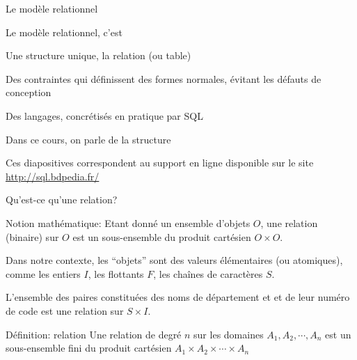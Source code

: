 
\begin{frame}[fragile]{Le modèle relationnel}

Le modèle relationnel, c'est

\begin{redbullet}
  \item Une structure unique, la relation (ou table)
  \item Des contraintes qui définissent des \alert{formes normales}, évitant les défauts de conception
  \item Des langages, concrétisés en pratique par SQL
\end{redbullet}

\vfill

Dans ce cours, on parle de la structure

\vfill
\begin{blocgauche}
\alert{Ces diapositives correspondent au support en ligne disponible sur
le site \url{http://sql.bdpedia.fr/}}
\end{blocgauche}

\end{frame}


\begin{frame}{Qu'est-ce qu'une relation?}

\alert{Notion mathématique}: 
Etant donné un ensemble d'objets $O$, une \alert{relation} (binaire)
sur $O$  est un sous-ensemble du produit cartésien $O \times O$.

\vfill
 Dans notre contexte, les ``objets''  sont des \alert{valeurs élémentaires} 
 (ou \alert{atomiques}), comme 
 les entiers $I$, les flottants $F$, les chaînes de caractères $S$.


\vfill
\begin{blocgauche}
L'ensemble des paires constituées des noms de département et 
et de leur numéro de code  est une relation sur $S \times I$. 

\begin{defblock}{Définition: relation}
Une relation de degré $n$ sur les domaines $A_1, A_2, \cdots, A_n$
    est un sous-ensemble \alert{fini} du produit cartésien  $A_1 \times A_2 \times  \cdots \times A_n$
\end{defblock}
\end{blocgauche}
\end{frame}


